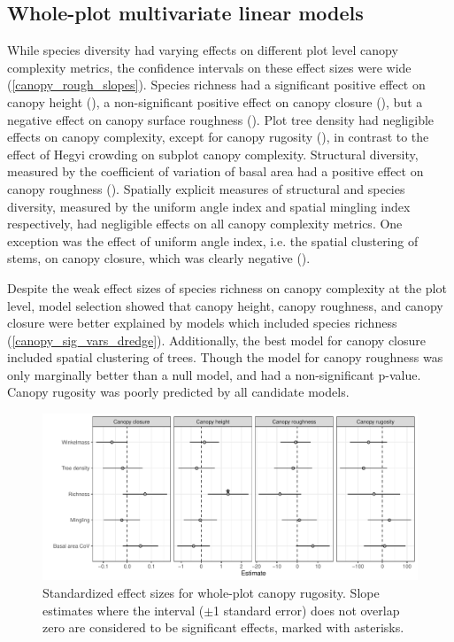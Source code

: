 \documentclass[11pt,a4paper]{article}
\begin{document}


\subsection{Whole-plot multivariate linear models}

While species diversity had varying effects on different plot level canopy complexity metrics, the confidence intervals on these effect sizes were wide (\autoref{canopy_rough_slopes}). Species richness had a significant positive effect on canopy height (\richHeightP{}), a non-significant positive effect on canopy closure (\richCoverP{}), but a negative effect on canopy surface roughness (\richRoughP{}). Plot tree density had negligible effects on canopy complexity, except for canopy rugosity (\treeDensRugP{}), in contrast to the effect of Hegyi crowding on subplot canopy complexity. Structural diversity, measured by the coefficient of variation of basal area had a positive effect on canopy roughness (\covBARoughP{}). Spatially explicit measures of structural and species diversity, measured by the uniform angle index and spatial mingling index respectively, had negligible effects on all canopy complexity metrics. One exception was the effect of uniform angle index, i.e. the spatial clustering of stems, on canopy closure, which was clearly negative (\wiCoverP{}). 

Despite the weak effect sizes of species richness on canopy complexity at the plot level, model selection showed that canopy height, canopy roughness, and canopy closure were better explained by models which included species richness (\autoref{canopy_sig_vars_dredge}). Additionally, the best model for canopy closure included spatial clustering of trees. Though the model for canopy roughness was only marginally better than a null model, and had a non-significant p-value. Canopy rugosity was poorly predicted by all candidate models.

\begin{figure}
	\includegraphics[width=\linewidth]{canopy_rough_slopes}
	\caption{Standardized effect sizes for whole-plot canopy rugosity. Slope estimates where the interval ($\pm$1 standard error) does not overlap zero are considered to be significant effects, marked with asterisks.}
	\label{canopy_rough_slopes}
\end{figure}
\end{document}
